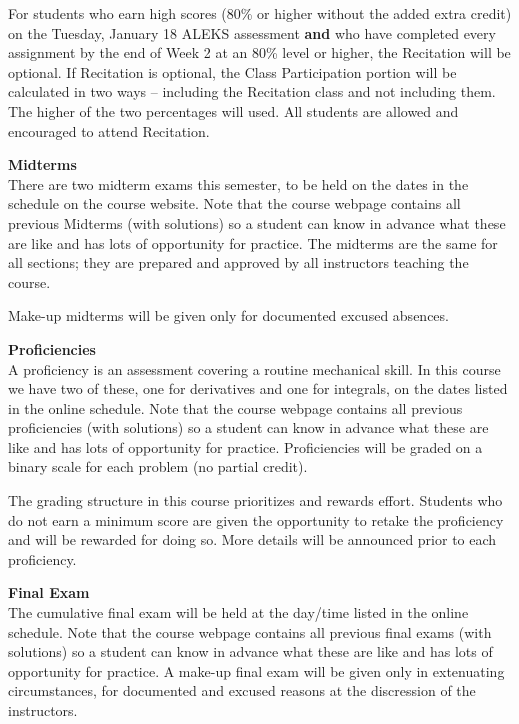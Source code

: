 \documentclass[12pt]{article}
\renewcommand{\emph}[1]{\textsf{\textbf{#1}}}
\newcommand{\localhead}[1]{\par\smallskip\textbf{#1}\nobreak\\}%
\def\heading#1{\localhead{\large\emph{#1}}}
\begin{document}
For students who earn high scores (80\% or higher without the added extra credit) on the Tuesday, January 18 ALEKS assessment \textbf{and} who have completed every assignment by the end of Week 2 at an 80\% level or higher, the Recitation will be optional. If Recitation is optional, the Class Participation portion will be calculated in two ways -- including the Recitation class and not  including them. The higher of the two percentages will used. All students are allowed and encouraged to attend Recitation.

\heading{Midterms}
There are two midterm exams this semester, to be held on the dates
in the schedule on the course website. Note that the course webpage contains all previous Midterms (with solutions) so a student can know in advance what these are like and has lots of opportunity for practice. The midterms are the same 
for all sections; they are prepared and approved by all instructors teaching the course. 



Make-up midterms will be given only for documented excused absences.

\heading{Proficiencies}
A proficiency is an assessment covering a routine mechanical skill.  In
this course we have two of these, one for derivatives and one for 
integrals, on the dates listed in the online schedule. Note that the course webpage contains all previous proficiencies (with solutions) so a student can know in advance what these are like and has lots of opportunity for practice.
Proficiencies will be graded on a binary scale for each problem
(no partial credit).  


The grading structure in this course prioritizes and rewards effort. Students who do not earn a minimum score are given the opportunity to retake the proficiency and will be rewarded for doing so. %
More details will be announced prior to each proficiency.

\heading{Final Exam} 
The cumulative final exam will be held at the day/time listed in the
online schedule. Note that the course webpage contains all previous final exams (with solutions) so a student can know in advance what these are like  and has lots of opportunity for practice.
A make-up final exam will be given only in extenuating circumstances, for documented and excused reasons at the discression of the instructors.
\end{document}
